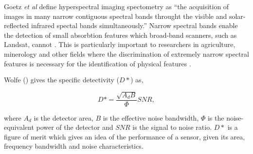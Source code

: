 


Goetz \emph{et al} \cite{Goetz1985} define hyperspectral imaging spectometry as ``the acquisition of images in many narrow contiguous spectral bands throught the visible and solar-reflected infrared spectal bands simultaneously.'' Narrow spectral bands enable the detection of small absorbtion features which broad-band scanners, such as Landsat, cannot \cite{Goetz1985}. This is particularly important to researchers in agriculture, minerology and other fields where the discrimination of extremely narrow spectral features is necessary for the identification of physical features \cite{Goetz1985}. 

Wolfe (\cite{Wolfe1997}) gives the specific detectivity ($D*$) as,

\begin{equation}
D* = \frac{\sqrt{A_d B}}{\Phi}SNR,
\end{equation}

where $A_d$ is the detector area, $B$ is the effective noise bandwidth, $\Phi$ is the noise-equivalent power of the detector and $SNR$ is the signal to noise ratio. $D*$ is a figure of merit which gives an idea of the performance of a sensor, given its area, frequency bandwidth and noise characteristics. 

